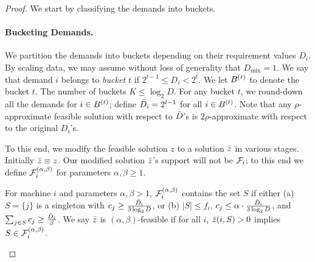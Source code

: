 	    \begin{proof}
	    We start by classifying the demands into buckets.
	    
	    	\paragraph{Bucketing Demands.} We partition the demands into buckets depending on their requirement values $D_i$. By scaling data, we may assume without loss of generality that $D_\mathrm{min} = 1$. 
	    	We say that demand $i$ belongs to \emph{bucket $t$} if $2^{t-1} \leq D_i < 2^t$. We let $B^{(t)}$ to denote the bucket $t$. The number of buckets $K \leq \log_2 D$. 
	    	For any bucket $t$, we round-down all the demands for $i\in B^{(t)}$; define $\bar{D}_i = 2^{t-1}$ for all $i\in B^{(t)}$. Note that any $\rho$-approximate feasible solution with respect to $\bar{D}$'s is $2\rho$-approximate with respect to the original $D_i$'s. \smallskip
	    
	    
	    
	    
\noindent
  To this end, we modify the feasible solution $z$ to a solution $\bar z$  in various stages. Initially $\bar z \equiv z$. 
	    Our modified solution $\bar z$'s support will not be ${\cal F}_i$; to this end we define ${\cal F}^{(\alpha,\beta)}_i$ for parameters $\alpha,\beta \geq 1$.
	    \begin{definition}
For machine $i$ and parameters $\alpha,\beta > 1$, ${\cal F}^{(\alpha,\beta)}_i$ contains the set $S$ if either (a) $S = \{j\}$ is a singleton with $c_j \geq \frac{\bar{D}_i}{3\log_2 D}$, 
or (b) $|S|\leq f_i$, $c_j \leq \alpha \cdot \frac{\bar{D}_i}{3\log_2 D}$, and $\sum_{j\in S} c_j \geq \frac{\bar{D}_i}{\beta}$. 	    We say $\bar z$ is $(\alpha,\beta)$-feasible if for all $i$, $\bar z(i,S) > 0$ implies $S\in {\cal F}^{(\alpha,\beta)}_i$.
	    \end{definition}
	    \noindent

	    \medskip
	
		

\end{proof}
